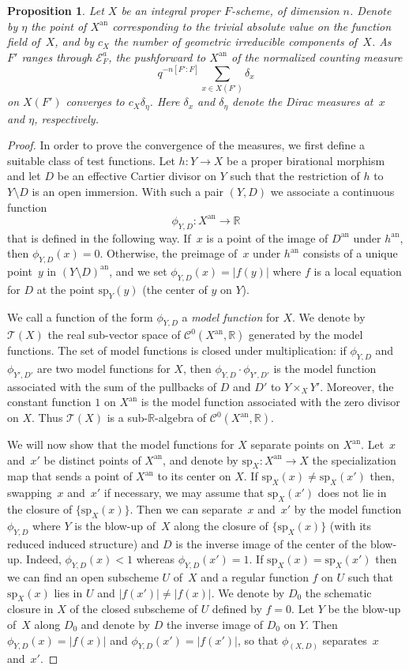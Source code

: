 \documentclass[11pt]{article}
\let\mathcal\mathscr
\newtheorem{prop}[equation]{Proposition}
\theoremstyle{definition}
\numberwithin{equation}{subsection}
\newcommand{\R}{\ensuremath{\mathbb{R}}}
\newcommand{\an}{\mathrm{an}}
\newcommand{\spe}{\mathrm{sp}}
\begin{document}
\begin{prop}\label{prop:langweil}
Let $X$ be an integral proper $F$-scheme, of dimension $n$.
Denote by $\eta$ the point of $X^{\an}$ corresponding to the trivial absolute value on the function field of~$X$, and by $c_X$ the number of geometric irreducible components of~$X$.
As $F'$ ranges through $\mathcal{E}_F^a$, the pushforward to $X^{\an}$ of the normalized counting measure
\[
q^{-n[F'\colon F]}\sum_{x\in X(F')}\delta_x
\]
on $X(F')$
converges to $c_X\delta_{\eta}$. Here
$\delta_x$ and $\delta_\eta$ denote the Dirac measures at~$x$ and $\eta$, respectively.
\end{prop}
\begin{proof}
In order to prove the convergence of the measures, we first define a suitable class of test functions. Let $h\colon Y\to X$ be a proper birational morphism and let $D$ be an effective Cartier divisor on $Y$ such that the restriction of $h$ to $Y\setminus D$ is an open immersion. With such a pair $(Y,D)$ we associate a continuous function
\[
\phi_{Y,D}\colon X^{\an}\to \R
\]
that is defined in the following way.
If~$x$ is a point of the image of $D^{\an}$ under $h^{\an}$, then $\phi_{Y,D}(x)=0$.
Otherwise, the preimage of~$x$ under $h^{\an}$ consists of a unique point~$y$ in $(Y\setminus D)^{\an}$, and we set $\phi_{Y,D}(x)=|f(y)|$ where $f$ is a local equation for $D$ at the point $\spe_{Y}(y)$ (the center of $y$ on $Y$).

We call a function of the form $\phi_{Y,D}$ a {\em model function} for $X$.
We denote by $\mathcal{T}(X)$ the real sub-vector space of $\mathcal{C}^0(X^{\an},\R)$ generated by the model functions.
The set of model functions is closed under multiplication: if $\phi_{Y,D}$ and $\phi_{Y',D'}$ are two model functions for $X$, then $\phi_{Y,D}\cdot \phi_{Y',D'}$ is the model function associated with the sum of the pullbacks of $D$ and $D'$ to $Y\times_X Y'$.
Moreover, the constant function $1$ on $X^{\an}$ is the model function associated with the zero divisor on $X$.
Thus $\mathcal{T}(X)$ is a sub-$\R$-algebra of $\mathcal{C}^0(X^{\an},\R)$.

We will now show that the model functions for $X$ separate points on $X^{\an}$. Let~$x$ and~$x'$ be distinct points of $X^{\an}$, and denote by $\spe_X\colon X^{\an}\to X$ the specialization map that sends a point of $X^{\an}$ to its center on $X$.
If $\spe_X(x)\neq \spe_X(x')$ then, swapping~$x$ and~$x'$ if necessary, we may assume that
$\spe_X(x')$ does not lie in the closure of $\{\spe_X(x)\}$.
Then we can separate~$x$ and~$x'$ by the model function $\phi_{Y,D}$ where $Y$ is the blow-up of~$X$ along the closure of $\{\spe_X(x)\}$ (with its reduced induced structure) and $D$ is the inverse image of the center of the blow-up. Indeed, $\phi_{Y,D}(x)<1$ whereas $\phi_{Y,D}(x')=1$. If $\spe_X(x)= \spe_X(x')$ then we can find an open subscheme $U$ of~$X$ and a regular function $f$ on $U$ such that $\spe_X(x)$ lies in $U$ and
$|f(x')|\neq |f(x)|$. We denote by $D_0$ the schematic closure in $X$ of the closed subscheme of $U$ defined by $f=0$. Let $Y$ be the blow-up of~$X$ along $D_0$ and denote by $D$ the inverse image of $D_0$ on $Y$. Then $\phi_{Y,D}(x)=|f(x)|$ and $\phi_{Y,D}(x')=|f(x')|$, so that $\phi_{(X,D)}$ separates~$x$ and~$x'$.


\end{proof}
\end{document}

